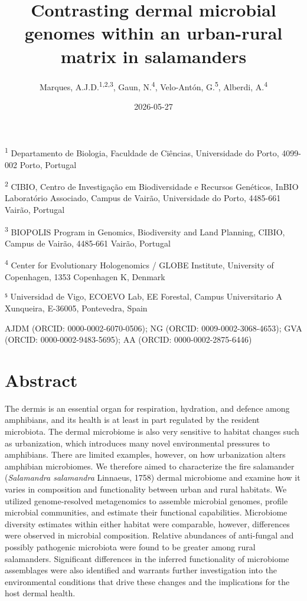 \documentclass[
  12pt,
]{article}
\title{Contrasting dermal microbial genomes within an urban-rural matrix
in salamanders}
\author{Marques, A.J.D.\textsuperscript{1,2,3}, Gaun,
N.\textsuperscript{4}, Velo-Antón, G.\textsuperscript{5}, Alberdi,
A.\textsuperscript{4}}
\date{2026-05-27}
\begin{document}
\maketitle

\textsuperscript{1} Departamento de Biologia, Faculdade de Ciências,
Universidade do Porto, 4099-002 Porto, Portugal

\textsuperscript{2} CIBIO, Centro de Investigação em Biodiversidade e
Recursos Genéticos, InBIO Laboratório Associado, Campus de Vairão,
Universidade do Porto, 4485-661 Vairão, Portugal

\textsuperscript{3} BIOPOLIS Program in Genomics, Biodiversity and Land
Planning, CIBIO, Campus de Vairão, 4485-661 Vairão, Portugal

\textsuperscript{4} Center for Evolutionary Hologenomics / GLOBE
Institute, University of Copenhagen, 1353 Copenhagen K, Denmark

⁵ Universidad de Vigo, ECOEVO Lab, EE Forestal, Campus Universitario A
Xunqueira, E-36005, Pontevedra, Spain

AJDM (ORCID: 0000-0002-6070-0506); NG (ORCID: 0009-0002-3068-4653); GVA
(ORCID: 0000-0002-9483-5695); AA (ORCID: 0000-0002-2875-6446)

\newpage

\section{Abstract}\label{abstract}

The dermis is an essential organ for respiration, hydration, and defence
among amphibians, and its health is at least in part regulated by the
resident microbiota. The dermal microbiome is also very sensitive to
habitat changes such as urbanization, which introduces many novel
environmental pressures to amphibians. There are limited examples,
however, on how urbanization alters amphibian microbiomes. We therefore
aimed to characterize the fire salamander (\emph{Salamandra salamandra}
Linnaeus, 1758) dermal microbiome and examine how it varies in
composition and functionality between urban and rural habitats. We
utilized genome-resolved metagenomics to assemble microbial genomes,
profile microbial communities, and estimate their functional
capabilities. Microbiome diversity estimates within either habitat were
comparable, however, differences were observed in microbial composition.
Relative abundances of anti-fungal and possibly pathogenic microbiota
were found to be greater among rural salamanders. Significant
differences in the inferred functionality of microbiome assemblages were
also identified and warrants further investigation into the
environmental conditions that drive these changes and the implications
for the host dermal health.
\end{document}
